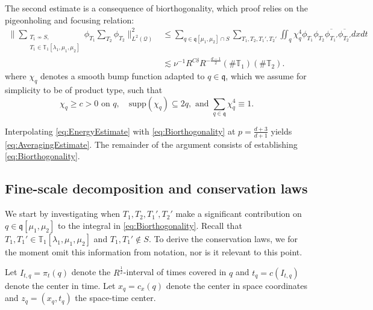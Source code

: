 \documentclass{amsart}
\theoremstyle{definition}
\newcommand{\T}{\mathbb{T}}
\begin{document}
\smallskip

The second estimate is a consequence of biorthogonality, which proof relies on the pigeonholing and focusing relation: 
\begin{equation}
\label{eq:Biorthogonality}
\begin{split}
\big\| \sum_{\substack{T_1 \not\sim S, \\ T_1 \in \T_1[\lambda_1,\mu_1,\mu_2]}} \phi_{T_1} \sum_{T_2} \phi_{T_2} \big\|^2_{L^2(\mathcal{Q})} &\leq \sum_{q \in \mathfrak{q}[\mu_1,\mu_2]\cap S} \sum_{T_1,T_2,T_1',T_2'} \iint_q \chi_q^4 \phi_{T_1} \phi_{T_2} \overline{\phi_{T_1'}} \overline{\phi_{T_2'}} dx dt \\
&\lesssim \nu^{-1} R^{C \delta} R^{-\frac{d-1}{2}} (\# \T_1) (\# \T_2).
\end{split}
\end{equation}
where $\chi_q$ denotes a smooth bump function adapted to $q \in \mathfrak{q}$, which we assume for simplicity to be of product type, such that
\begin{equation*}
\chi_q \geq c > 0 \text{ on } q, \quad \text{supp}(\chi_q) \subseteq 2 q, \text{ and } \sum_{q \in \mathfrak{q}} \chi_q^4 \equiv 1.
\end{equation*}

Interpolating \eqref{eq:EnergyEstimate} with \eqref{eq:Biorthogonality} at $p=\frac{d+3}{d+1}$ yields \eqref{eq:AveragingEstimate}. The remainder of the argument consists of establishing \eqref{eq:Biorthogonality}.

\subsection{Fine-scale decomposition and conservation laws}
\label{subsection:FineScaleDecomposition}

We start by investigating when  $T_1, T_2, T_1', T_2'$  make a significant contribution on $q \in \mathfrak{q}[\mu_1,\mu_2]$ to the integral in \eqref{eq:Biorthogonality}. Recall that $T_1,T_1' \in \T_1[\lambda_1,\mu_1,\mu_2]$ and $T_1, T_1' \notin S$. To derive the conservation laws, we for the moment omit this information from notation, nor is it relevant to this point.

Let $I_{t,q} = \pi_t(q)$ denote the $R^{\frac{1}{2}}$-interval of times covered in $q$ and $t_q = c(I_{t,q})$ denote the center in time. Let $x_q = c_x(q)$ denote the center in space coordinates and $z_q = (x_q,t_q)$ the space-time center.
\end{document}
